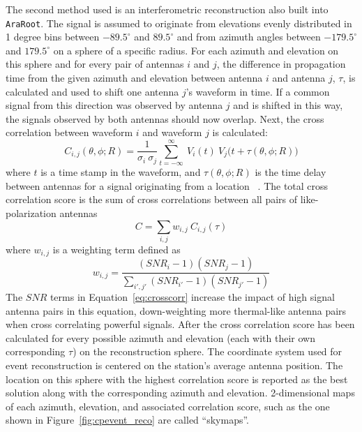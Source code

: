     The second method used is an interferometric reconstruction also built into \texttt{AraRoot}. 
    The signal is assumed to originate from elevations evenly distributed in 1 degree bins between $-89.5^{\circ}$ and $89.5^{\circ}$ and from azimuth angles between $-179.5^{\circ}$ and $179.5^{\circ}$ on a sphere of a specific radius.
    For each azimuth and elevation on this sphere and for every pair of antennas $i$ and $j$, the difference in propagation time from the given azimuth and elevation between antenna $i$ and antenna $j$, $\tau$, is calculated and used to shift one antenna $j$'s waveform in time. 
    If a common signal from this direction was observed by antenna $j$ and is shifted in this way, the signals observed by both antennas should now overlap.
    Next, the cross correlation between waveform $i$ and waveform $j$ is calculated:
    \begin{equation}
      C_{i,j}(\theta, \phi; R) = \frac{1}{\sigma_i ~ \sigma_j} \sum_{t=-\infty}^{\infty} ~ V_i(t) ~ V_j\big(t+\tau(\theta, \phi; R)\big)
    \end{equation}
    where $t$ is a time stamp in the waveform, and $\tau(\theta, \phi; R)$ is the time delay between antennas for a signal originating from a location ~\citep{thesis_clark}.
    The total cross correlation score is the sum of cross correlations between all pairs of like-polarization antennas
    \begin{equation}
      C = \sum_{i,j} w_{i,j} ~ C_{i,j}(\tau)
      \label{eq:crosscorr}
    \end{equation}
    where $w_{i,j}$ is a weighting term defined as 
    \begin{equation}
      w_{i,j} = \frac{ (SNR_i - 1) (SNR_j - 1)}{ \sum_{i', j'}(SNR_{i'} - 1)(SNR_{j'} - 1)}
    \end{equation}
    The $SNR$ terms in Equation~\ref{eq:crosscorr} increase the impact of high signal antenna pairs in this equation, down-weighting more thermal-like antenna pairs when cross correlating powerful signals.
    After the cross correlation score has been calculated for every possible azimuth and elevation (each with their own corresponding $\tau$) on the reconstruction sphere.
    The coordinate system used for event reconstruction is centered on the station's average antenna position.
    The location on this sphere with the highest correlation score is reported as the best solution along with the corresponding azimuth and elevation.
    2-dimensional maps of each azimuth, elevation, and associated correlation score, such as the one shown in Figure~\ref{fig:cpevent_reco} are called ``skymaps''.
